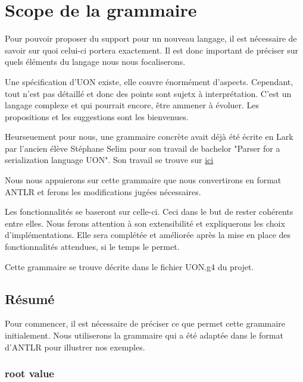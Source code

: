 \documentclass[
    iict, %
    il, %
]{heig-tb}
\begin{document}


\chapter{Scope de la grammaire}\label{grammar scope}
Pour pouvoir proposer du support pour un nouveau langage, il est nécessaire de savoir sur quoi celui-ci portera exactement.
Il est donc important de préciser sur quels éléments du langage nous nous focaliserons.

Une spécification d'UON existe, elle couvre énormément d'aspects. Cependant, tout n'est pas détaillé et donc des points sont sujetx à interprétation.
C'est un langage complexe et qui pourrait encore, être ammener à évoluer. Les propositions et les suggestions sont les bienvenues.

Heurseuement pour nous, une grammaire concrète avait déjà été écrite en Lark par l'ancien élève Stéphane Selim pour son travail de bachelor "Parser for a serialization language UON".
Son travail se trouve sur \href{https://github.com/uon-language/uon-parser}{ici}

Nous nous appuierons sur cette grammaire que nous convertirons en format ANTLR et ferons les modifications jugées nécessaires.

Les fonctionnalités se baseront sur celle-ci. Ceci dans le but de rester cohérents entre elles.
Nous ferons attention à son extensibilité et expliquerons les choix d'implémentations.
Elle sera complétée et améliorée après la mise en place des fonctionnalités attendues, si le temps le permet.

Cette grammaire se trouve décrite dans le fichier UON.g4 du projet.

\section{Résumé}
Pour commencer, il est nécessaire de préciser ce que permet cette grammaire initialement.
Nous utiliserons la grammaire qui a été adaptée dans le format d'ANTLR pour illustrer nos exemples.


\subsection{root value}
\end{document}
